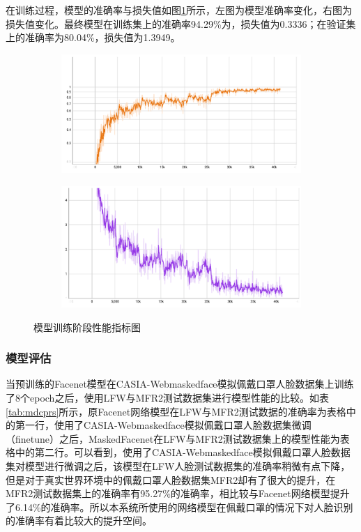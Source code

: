 在训练过程，模型的准确率与损失值如图\ref{fig:mdmtx}所示，左图为模型准确率变化，右图为损失值变化。最终模型在训练集上的准确率94.29\%为，损失值为0.3336；在验证集上的准确率为80.04\%，损失值为1.3949。

\begin{figure}[H]
    \centering
    \begin{subfigure}{.45\textwidth}
        \centering
        \includegraphics[width=\textwidth]{figures/5acc.png}
    \end{subfigure}
    \qquad
    \begin{subfigure}{.45\textwidth}
        \centering
        \includegraphics[width=\textwidth]{figures/5loss.png}
    \end{subfigure}
    \caption{模型训练阶段性能指标图}
    \label{fig:mdmtx}
\end{figure}

\subsubsection{模型评估}

当预训练的Facenet模型在CASIA-Webmaskedface模拟佩戴口罩人脸数据集上训练了8个epoch之后，使用LFW与MFR2测试数据集进行模型性能的比较。如表\ref{tab:mdcprs}所示，原Facenet网络模型在LFW与MFR2测试数据的准确率为表格中的第一行，使用了CASIA-Webmaskedface模拟佩戴口罩人脸数据集微调（finetune）之后，MaskedFacenet在LFW与MFR2测试数据集上的模型性能为表格中的第二行。可以看到，使用了CASIA-Webmaskedface模拟佩戴口罩人脸数据集对模型进行微调之后，该模型在LFW人脸测试数据集的准确率稍微有点下降，但是对于真实世界环境中的佩戴口罩人脸数据集MFR2却有了很大的提升，在MFR2测试数据集上的准确率有95.27\%的准确率，相比较与Facenet网络模型提升了6.14\%的准确率。所以本系统所使用的网络模型在佩戴口罩的情况下对人脸识别的准确率有着比较大的提升空间。

